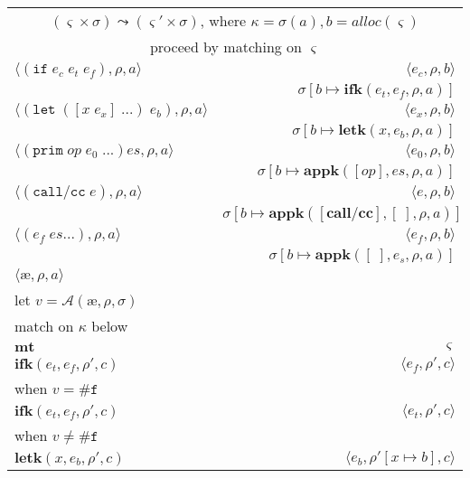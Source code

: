 \documentclass[12pt,draft]{article}
\newcommand\mae{\ensuremath{\text{\ae}}}
\newcommand{\letsyn}[3]{(\texttt{let}\;([#1\;#2]\;...)\;#3)}
\newcommand{\ifsyn}[3]{(\texttt{if}\;#1\;#2\;#3)}
\newcommand{\primsyn}[2]{(\texttt{prim}\;#1\;#2\;...)}
\newcommand{\callccsyn}[1]{(\texttt{call/cc}\;#1)}
\newcommand{\falsesyn}{\texttt{\#f}}
\begin{document}
\begin{center}
\begin{tabular}{@{}l | r@{}}
\multicolumn{2}{c}{$(\varsigma \times \sigma) \leadsto (\varsigma' \times \sigma)$, 
where $\kappa = \sigma(a) , b = alloc(\varsigma) $} \\
\multicolumn{2}{c}{proceed by matching on $\varsigma$} \\
\hline\hline
$\langle
\ifsyn{e_c}{e_t}{e_f} , \rho , a
\rangle$
&$\langle
e_c , \rho , b 
\rangle$ \\
& $\sigma[b \mapsto \textbf{ifk}(e_t , e_f , \rho , a)]$ \\
\hline
$\langle
\letsyn{x}{e_x}{e_b} , \rho , a
\rangle$
&$\langle
e_x , \rho , b
\rangle$ \\
& $\sigma[b \mapsto \textbf{letk}(x , e_b , \rho , a)]$ \\
\hline
$\langle
\primsyn{op}{e_0}{es} , \rho , a
\rangle$
&$\langle
e_0 , \rho , b
\rangle$ \\
& $\sigma[b \mapsto \textbf{appk}([op] ,  es , \rho , a)]$ \\
\hline
$\langle
\callccsyn{e} , \rho , a
\rangle$
&$\langle
e , \rho , b
\rangle$ \\
&$\sigma[b \mapsto \textbf{appk}([\textbf{call/cc}] , [\;] , \rho , a)]$ \\
\hline
$\langle
(e_f \; es ...) , \rho , a
\rangle$
&$\langle
e_f , \rho , b
\rangle$ \\
& $\sigma[b \mapsto \textbf{appk}([\;] , e_s , \rho , a)]$ \\
\hline
$\langle \mae , \rho , a \rangle$ & \\
let $v = \mathcal{A}(\mae, \rho, \sigma)$ \\
match on $\kappa$ below \\
\hline
$ \textbf{mt}$ & $\varsigma$ \\
\hline
$ \textbf{ifk}(e_t , e_f , \rho' , c) $ 
& $\langle e_f , \rho' , c \rangle$ \\
when $v = \falsesyn$ & \\
\hline
$ \textbf{ifk}(e_t , e_f , \rho' , c) $ 
& $\langle e_t , \rho' , c \rangle$ \\
when $v \not= \falsesyn$ & \\
\hline
$ \textbf{letk}(x , e_b , \rho' , c) $
& $\langle e_b , \rho'[x \mapsto b] , c \rangle$ \\

\end{tabular}
\end{center}
\end{document}
